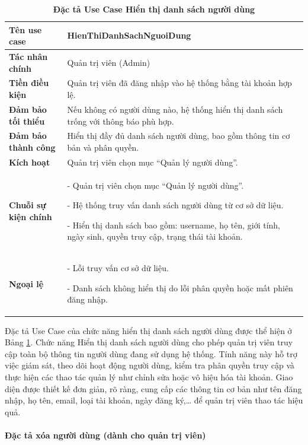 \documentclass{article}
\begin{document}
	\begin{table}[H]
		\centering
		\caption [Đặc tả Use Case Hiển thị danh sách người dùng]{\bfseries \fontsize{12pt}{0pt}\selectfont Đặc tả Use Case Hiển thị danh sách người dùng}
		\label{tab39}
		\begin{tabular}{|p{4cm}|p{10.5cm}|}
			\hline
			\textbf{Tên use case} & HienThiDanhSachNguoiDung \\
			\hline
			\textbf{Tác nhân chính} & Quản trị viên (Admin) \\
			\hline
			\textbf{Tiền điều kiện} & Quản trị viên đã đăng nhập vào hệ thống bằng tài khoản hợp lệ. \\
			\hline
			\textbf{Đảm bảo tối thiểu} & Nếu không có người dùng nào, hệ thống hiển thị danh sách trống với thông báo phù hợp. \\
			\hline
			\textbf{Đảm bảo thành công} & Hiển thị đầy đủ danh sách người dùng, bao gồm thông tin cơ bản và phân quyền. \\
			\hline
			\textbf{Kích hoạt} & Quản trị viên chọn mục “Quản lý người dùng”. \\
			\hline
			\textbf{Chuỗi sự kiện chính} &
			- Quản trị viên chọn mục “Quản lý người dùng”.
			
			- Hệ thống truy vấn danh sách người dùng từ cơ sở dữ liệu.
			
			- Hiển thị danh sách bao gồm: username, họ tên, giới tính, ngày sinh, quyền truy cập, trạng thái tài khoản.
			\\
			\hline
			\textbf{Ngoại lệ} &
			- Lỗi truy vấn cơ sở dữ liệu.
			
			- Danh sách không hiển thị do lỗi phân quyền hoặc mất phiên đăng nhập.
			\\
			\hline
		\end{tabular}
	\end{table}
	
	Đặc tả Use Case của chức năng hiển thị danh sách người dùng được thể hiện ở Bảng \ref{tab39}. Chức năng Hiển thị danh sách người dùng cho phép quản trị viên truy cập toàn bộ thông tin người dùng đang sử dụng hệ thống. Tính năng này hỗ trợ việc giám sát, theo dõi hoạt động người dùng, kiểm tra phân quyền truy cập và thực hiện các thao tác quản lý như chỉnh sửa hoặc vô hiệu hóa tài khoản. Giao diện được thiết kế đơn giản, rõ ràng, cung cấp các thông tin cơ bản như tên đăng nhập, họ tên, email, loại tài khoản, ngày đăng ký,… để quản trị viên thao tác hiệu quả.
	
	\paragraph{Đặc tả xóa người dùng (dành cho quản trị viên)} \mbox{}
	
\end{document}
